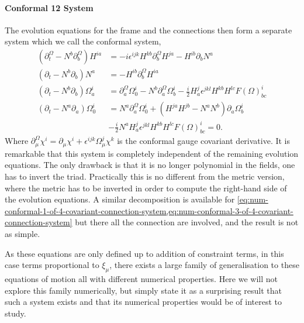 \documentclass[10pt]{report}
\theoremstyle{definition}
\begin{document}
        \paragraph{Conformal 12 System}
        The evolution equations for the frame and the connections then form a separate system which we call the conformal system,
        \begin{equation}
            \begin{aligned} \label{eq:num-plebanski-12-conformal-system}
                (\partial^\Omega_t - N^b \partial^\Omega_b) H^{ia} &= -i \epsilon^{ijk} H^{kb} \partial^\Omega_b H^{ja} - H^{ib} \partial_b N^a \\
                (\partial_t - N^b \partial_b) N^a &= - H^{ib} \partial_b^\Omega H^{ia} \\
                (\partial_t - N^b \partial_b) \Omega^i_a & = \partial^\Omega_a \Omega^i_0 - N^b \partial^\Omega_a \Omega^i_b - \frac{i}{2} H^j_a \epsilon^{jkl} H^{kb} H^{lc} F(\Omega)^i_{bc} \\
                (\partial_t - N^a \partial_a) \Omega^i_0 & = N^a \partial^\Omega_a \Omega^i_0 + ( H^{ja} H^{jb} - N^a N^b ) \partial_a \Omega^i_b \nonumber \\ & - \frac{i}{2} N^a H^j_a \epsilon^{jkl} H^{kb} H^{lc} F(\Omega)^i_{bc} = 0.
            \end{aligned}
        \end{equation}
        Where $\partial^\Omega_\mu \chi^i = \partial_\mu \chi^i + \epsilon^{ijk} \Omega^j_\mu \chi^k$ is the conformal gauge covariant derivative. It is remarkable that this system is completely independent of the remaining evolution equations. The only drawback is that it is no longer polynomial in the fields, one has to invert the triad. Practically this is no different from the metric version, where the metric has to be inverted in order to compute the right-hand side of the evolution equations. A similar decomposition is available for \cref{eq:num-conformal-1-of-4-covariant-connection-system,eq:num-conformal-3-of-4-covariant-connection-system} but there all the connection are involved, and the result is not as simple. 
        
        As these equations are only defined up to addition of constraint terms, in this case terms proportional to $\xi_\mu$, there exists a large family of generalisation to these equations of motion all with different numerical properties. Here we will not explore this family numerically, but simply state it as a surprising result that such a system exists and that its numerical properties would be of interest to study.
\end{document}
